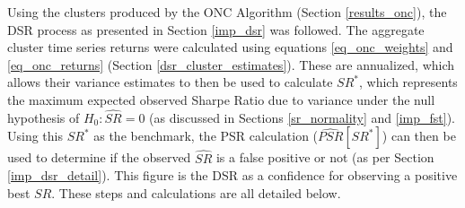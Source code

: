 \documentclass[a4paper,11pt,oneside]{article}
\theoremstyle{plain}
\theoremstyle{definition}
\begin{document}
	Using the clusters produced by the ONC Algorithm (Section \ref{results_onc}), the DSR process as presented in Section \ref{imp_dsr} was followed. The aggregate cluster time series returns were calculated using equations \ref{eq_onc_weights} and \ref{eq_onc_returns} (Section \ref{dsr_cluster_estimates}). These are annualized, which allows their variance estimates to then be used to calculate $SR^*$, which represents the maximum expected observed Sharpe Ratio due to variance under the null hypothesis of $H_0:  \widehat{SR} = 0$ (as discussed in Sections \ref{sr_normality} and \ref{imp_fst}). Using this $SR^*$ as the benchmark, the PSR calculation ($\widehat{PSR}[SR^*]$) can then be used to determine if the observed $\widehat{SR}$ is a false positive or not (as per Section \ref{imp_dsr_detail}). This figure is the DSR as a confidence for observing a positive best $SR$. These steps and calculations are all detailed below. \newline
	
\end{document}

